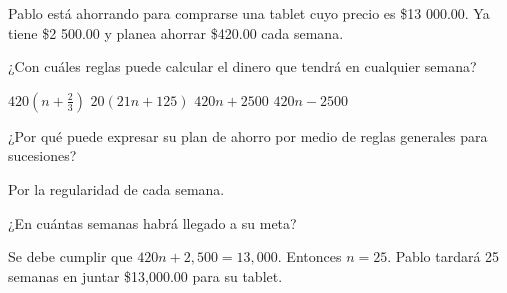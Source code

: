 Pablo está ahorrando para comprarse una tablet cuyo precio es \$13 000.00. Ya
tiene \$2 500.00 y planea ahorrar \$420.00 cada semana.

\begin{parts}
    ¿Con cuáles reglas puede calcular el dinero que tendrá en cualquier semana?

    \begin{oneparcheckboxes}
        \choice $420\left(n+\frac{2}{3}\right)$
        \CorrectChoice $20\left(21n+125\right)$
        \CorrectChoice $420n+2500$
        \choice $420n-2500$
    \end{oneparcheckboxes}

    \begin{solutionbox}{1.5cm}

    \end{solutionbox}

    ¿Por qué puede expresar su plan de ahorro por medio de reglas generales para sucesiones?

    \begin{solutionbox}{1.5cm}
        Por la regularidad de cada semana.
    \end{solutionbox}
    ¿En cuántas semanas habrá llegado a su meta?

    \begin{solutionbox}{2cm}
        Se debe cumplir que $420n + 2,500 = 13,000$. Entonces $n = 25$. Pablo tardará 25 semanas en juntar \$13,000.00 para su tablet.
    \end{solutionbox}
\end{parts}